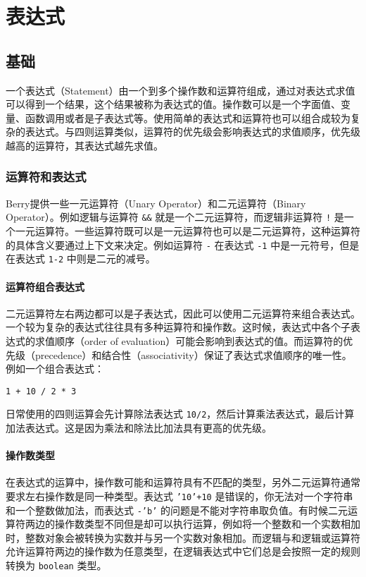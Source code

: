 \chapter{表达式}

\section{基础}

一个表达式（Statement）由一个到多个操作数和运算符组成，通过对表达式求值可以得到一个结果，这个结果被称为表达式的值。操作数可以是一个字面值、变量、函数调用或者是子表达式等。使用简单的表达式和运算符也可以组合成较为复杂的表达式。与四则运算类似，运算符的优先级会影响表达式的求值顺序，优先级越高的运算符，其表达式越先求值。

\subsection{运算符和表达式}

Berry提供一些一元运算符（Unary Operator）和二元运算符（Binary Operator）。例如逻辑与运算符 \texttt{\&\&} 就是一个二元运算符，而逻辑非运算符 \texttt{!} 是一个一元运算符。一些运算符既可以是一元运算符也可以是二元运算符，这种运算符的具体含义要通过上下文来决定。例如运算符 \texttt{-} 在表达式 \texttt{-1} 中是一元符号，但是在表达式 \texttt{1-2} 中则是二元的减号。

\subsubsection{运算符组合表达式}

二元运算符左右两边都可以是子表达式，因此可以使用二元运算符来组合表达式。一个较为复杂的表达式往往具有多种运算符和操作数。这时候，表达式中各个子表达式的求值顺序（order of evaluation）可能会影响到表达式的值。而运算符的优先级（precedence）和结合性（associativity）保证了表达式求值顺序的唯一性。例如一个组合表达式：
\begin{lstlisting}[language=berry, numbers=none]
1 + 10 / 2 * 3
\end{lstlisting}
日常使用的四则运算会先计算除法表达式 \texttt{10/2}，然后计算乘法表达式，最后计算加法表达式。这是因为乘法和除法比加法具有更高的优先级。

\subsubsection{操作数类型}

在表达式的运算中，操作数可能和运算符具有不匹配的类型，另外二元运算符通常要求左右操作数是同一种类型。表达式 \texttt{'10'+10} 是错误的，你无法对一个字符串和一个整数做加法，而表达式 \texttt{-'b'} 的问题是不能对字符串取负值。有时候二元运算符两边的操作数类型不同但是却可以执行运算，例如将一个整数和一个实数相加时，整数对象会被转换为实数并与另一个实数对象相加。而逻辑与和逻辑或运算符允许运算符两边的操作数为任意类型，在逻辑表达式中它们总是会按照一定的规则转换为 \texttt{boolean} 类型。

